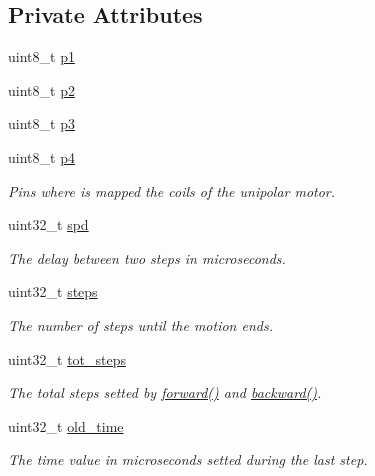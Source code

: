 \subsection*{Private Attributes}
\begin{DoxyCompactItemize}
\item 
uint8\+\_\+t \hyperlink{class_s_motor_a2c60b5c8fe692572070fdc95c6b4b51e}{p1}
\item 
uint8\+\_\+t \hyperlink{class_s_motor_a305bd59966c6596b977c2897cf6f3ee1}{p2}
\item 
uint8\+\_\+t \hyperlink{class_s_motor_a2ed385362a1d5701bb4f1a922838c986}{p3}
\item 
uint8\+\_\+t \hyperlink{class_s_motor_a9eeaaa8a47f74a6f2972650afa76d02f}{p4}
\begin{DoxyCompactList}\small\item\em Pins where is mapped the coils of the unipolar motor. \end{DoxyCompactList}\item 
uint32\+\_\+t \hyperlink{class_s_motor_a882d15d35626b66d6bb31a09c17b75b6}{spd}
\begin{DoxyCompactList}\small\item\em The delay between two steps in microseconds. \end{DoxyCompactList}\item 
uint32\+\_\+t \hyperlink{class_s_motor_a894a18a9c90ea2160d5790934491f346}{steps}
\begin{DoxyCompactList}\small\item\em The number of steps until the motion ends. \end{DoxyCompactList}\item 
uint32\+\_\+t \hyperlink{class_s_motor_acba02a638986e8e3e44302d824941692}{tot\+\_\+steps}
\begin{DoxyCompactList}\small\item\em The total steps setted by \hyperlink{class_s_motor_ae266c2af254d76012b8132bb7641628d}{forward()} and \hyperlink{class_s_motor_a9d666d613dffcc324e0ae6e1e0a31a3f}{backward()}. \end{DoxyCompactList}\item 
uint32\+\_\+t \hyperlink{class_s_motor_ae1327bd40d192a2fd84ab885a2b197bb}{old\+\_\+time}
\begin{DoxyCompactList}\small\item\em The time value in microseconds setted during the last step. \end{DoxyCompactList}\item 

\end{DoxyCompactItemize}
